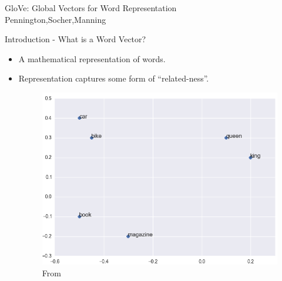 \begin{frame}
  \begin{center}
    {\huge GloVe: Global Vectors for Word Representation
    } \\
    Pennington,Socher,Manning
  \end{center}
\end{frame}

\begin{frame}{Introduction - What is a Word Vector?}
  \begin{itemize}
  \item A mathematical representation of words.
  \item Representation captures some form of ``related-ness''.
    \begin{figure}
      \includegraphics[scale=0.35]{images/wordvec.png}
      \caption{From}
    \end{figure}    
  \end{itemize}
\end{frame}

